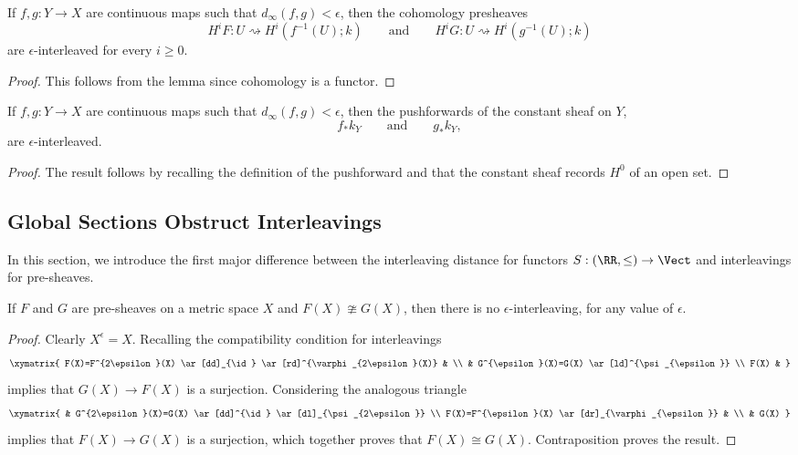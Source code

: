 \begin{cor}\label{cor:stability}
If $f,g:Y\to X$ are continuous maps such that $d_{\infty}(f,g)<\epsilon$, then the cohomology presheaves
\[
H^iF:U\rightsquigarrow H^i(f^{-1}(U);k) \qquad \mathrm{and} \qquad H^iG:U\rightsquigarrow H^i(g^{-1}(U);k)
\]
are $\epsilon$-interleaved for every $i\geq 0$.
\end{cor}
\begin{proof}
This follows from the lemma since cohomology is a functor.
\end{proof}

\begin{cor}
If $f,g:Y\to X$ are continuous maps such that $d_{\infty}(f,g)<\epsilon$, then the pushforwards of the constant sheaf on $Y$,
\[
f_*k_Y \qquad \mathrm{and} \qquad g_*k_Y,
\]
are $\epsilon$-interleaved.
\end{cor}
\begin{proof}
The result follows by recalling the definition of the pushforward and that the constant sheaf records $H^0$ of an open set.
\end{proof}

\subsection{Global Sections Obstruct Interleavings}

In this section, we introduce the first major difference between the interleaving distance for functors $S:(\RR,\leq)\to\Vect$ and interleavings for pre-sheaves.

\begin{lem}\label{lem:obstructs}
	If $F$ and $G$ are pre-sheaves on a metric space $X$ and $F(X)\ncong G(X)$, then there is no $\epsilon$-interleaving, for any value of $\epsilon$.
\end{lem}
\begin{proof}
Clearly $X^{\epsilon}=X$. Recalling the compatibility condition for interleavings
\[	
\xymatrix{ F(X)=F^{2\epsilon}(X) \ar[dd]_{\id} \ar[rd]^{\varphi_{2\epsilon}(X)} & \\
 & G^{\epsilon}(X)=G(X) \ar[ld]^{\psi_{\epsilon}} \\
F(X) & }
\]
implies that $G(X)\to F(X)$ is a surjection. Considering the analogous triangle
\[
\xymatrix{
	& G^{2\epsilon}(X)=G(X) \ar[dd]^{\id} \ar[dl]_{\psi_{2\epsilon}} \\
	F(X)=F^{\epsilon}(X) \ar[dr]_{\varphi_{\epsilon}} & \\
	& G(X)
}
\]
implies that $F(X)\to G(X)$ is a surjection, which together proves that $F(X)\cong G(X)$. Contraposition proves the result.
\end{proof}

